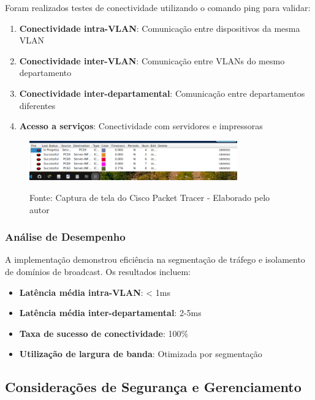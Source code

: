 Foram realizados testes de conectividade utilizando o comando ping para validar:

\begin{enumerate}
    \item \textbf{Conectividade intra-VLAN}: Comunicação entre dispositivos da mesma VLAN
    \item \textbf{Conectividade inter-VLAN}: Comunicação entre VLANs do mesmo departamento
    \item \textbf{Conectividade inter-departamental}: Comunicação entre departamentos diferentes
    \item \textbf{Acesso a serviços}: Conectividade com servidores e impressoras
\end{enumerate}

\begin{figure}[H]
\centering
{}
\includegraphics[width=0.8\textwidth]{figure/conectividade.png}

\label{fig:testes_conectividade}
{\fontsize{10pt}{\baselineskip}\selectfont
Fonte: Captura de tela do Cisco Packet Tracer - Elaborado pelo autor}
\end{figure}

\subsubsection{Análise de Desempenho}

A implementação demonstrou eficiência na segmentação de tráfego e isolamento de domínios de broadcast. Os resultados incluem:

\begin{itemize}
    \item \textbf{Latência média intra-VLAN}: < 1ms
    \item \textbf{Latência média inter-departamental}: 2-5ms
    \item \textbf{Taxa de sucesso de conectividade}: 100\%
    \item \textbf{Utilização de largura de banda}: Otimizada por segmentação
\end{itemize}

\subsection{Considerações de Segurança e Gerenciamento}

